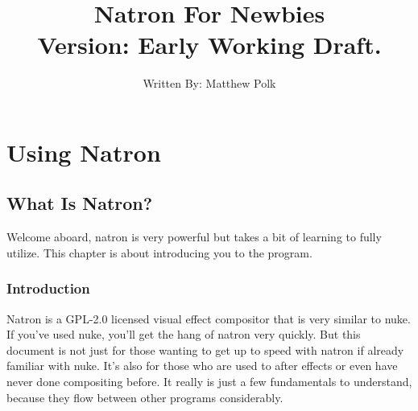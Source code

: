\documentclass[letterpaper,12pt,oneside]{book}
\title{Natron For Newbies\\Version: Early Working Draft.}
\author{Written By: Matthew Polk}
\date{}
\begin{document}
\renewcommand{\contentsname}{Table of Contents}
\frontmatter
\hypersetup{pageanchor=false}
\maketitle
\hypersetup{pageanchor=true}

\tableofcontents
\mainmatter
\pagestyle{plain}
\part{Using Natron}

\chapter{What Is Natron?}
Welcome aboard, natron is very powerful but takes a bit of learning to
fully utilize. This chapter is about introducing you to the program.

\bigbreak
\section{Introduction}
Natron is a GPL-2.0 licensed visual effect compositor that is very similar to nuke. If you've used nuke, you'll get the hang of natron very quickly. But this document is not just for those wanting to get up to speed with natron if already familiar with nuke. It's also for those who are used to after effects or even have never done compositing before. It really is just a few fundamentals to understand, because they flow between other programs considerably.
\newpage
\end{document}
